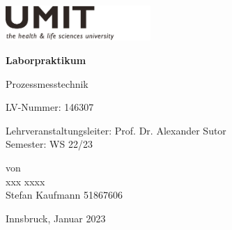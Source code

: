 \documentclass[11pt,oneside,bibtotoc,liststotoc]{scrbook}
\begin{document}
\thispagestyle{empty}
\graphicspath{{images/}}
\kern-13.5mm\includegraphics[width=55mm]{image/Titel/logo_umit.pdf}
 


\vspace*{2cm}\par
\begin{center}

{\huge \textbf{ Laborpraktikum}} \\[1em]
\vspace{2cm}\par

{\large Prozessmesstechnik}
\vspace{1cm}\par
{\large LV-Nummer: 146307}
\vspace{1cm}\par
Lehrveranstaltungsleiter: Prof. Dr. Alexander Sutor \\
Semester: WS 22/23



von \\[1ex]
xxx xxxx \\
Stefan Kaufmann    51867606 
\vspace{1cm}\par

Innsbruck, Januar 2023

\end{center}



\thispagestyle{empty}

\setcounter{page}{1}
\renewcommand{\baselinestretch}{1.00}\normalsize
\tableofcontents
\listoffigures
\listoftables
\renewcommand{\baselinestretch}{1.5}\normalsize
\newpage
\setcounter{page}{1}

 
\newpage
\newpage
%
\newpage
%
\newpage
%









%
\clearpage

%
\end{document}
